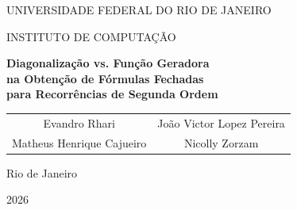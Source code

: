 
\begin{titlepage}
  \centering

  \vspace*{1cm}

  {\large UNIVERSIDADE FEDERAL DO RIO DE JANEIRO\par}
  \vspace{0.3cm}
  {\normalsize INSTITUTO DE COMPUTAÇÃO\par}

  \vspace{3.5cm}

  {\huge\bfseries
    Diagonalização vs. Função Geradora \\
    na Obtenção de Fórmulas Fechadas \\
    para Recorrências de Segunda Ordem
    \par
  }

  \vspace{3.6cm}

  \begin{tabular}{cc}
    Evandro Rhari & João Victor Lopez Pereira \\[0.3cm]
    Matheus Henrique Cajueiro & Nicolly Zorzam
  \end{tabular}

  \vfill

  {\large Rio de Janeiro\par}
  \vspace{0.2cm}
  {\large 2026\par}

\end{titlepage}
